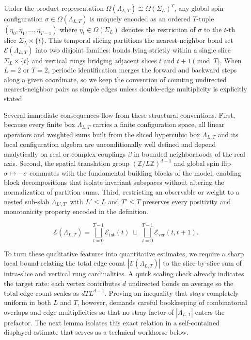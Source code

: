 \documentclass[11pt]{article}
\theoremstyle{definition}
\begin{document}
Under the product representation $\Omega(\Lambda_{L,T}) \cong \Omega(\Sigma_L)^T$,
any global spin configuration $\sigma \in \Omega(\Lambda_{L,T})$ is uniquely encoded
as an ordered $T$-tuple $(\eta_0, \eta_1, \dots, \eta_{T-1})$ where $\eta_t \in
\Omega(\Sigma_L)$ denotes the restriction of $\sigma$ to the $t$-th slice $\Sigma_L
\times \{t\}$. This temporal slicing partitions the nearest-neighbor bond set
$\mathcal{E}(\Lambda_{L,T})$ into two disjoint families: bonds lying strictly within
a single slice $\Sigma_L \times \{t\}$ and vertical rungs bridging adjacent slices
$t$ and $t + 1 \pmod{T}$. When $L = 2$ or $T = 2$, periodic identification merges
the forward and backward steps along a given coordinate, so we keep the convention
of counting undirected nearest-neighbor pairs as simple edges unless double-edge
multiplicity is explicitly stated.

Several immediate consequences flow from these structural conventions. First,
because every finite box $\Lambda_{L,T}$ carries a finite configuration space, all
linear operators and weighted sums built from the sliced hypercubic box
$\Lambda_{L,T}$ and its local configuration algebra are unconditionally well defined
and depend analytically on real or complex couplings $\beta$ in bounded
neighborhoods of the real axis. Second, the spatial translation group
$(\mathbb{Z}/L\mathbb{Z})^{d-1}$ and global spin flip $\sigma \mapsto -\sigma$
commutes with the fundamental building blocks of the model, enabling block
decompositions that isolate invariant subspaces without altering the normalization
of partition sums. Third, restricting an observable or weight to a nested sub-slab
$\Lambda_{L',T'}$ with $L' \le L$ and $T' \le T$ preserves every positivity and
monotonicity property encoded in the definition.

\[
  \mathcal{E}(\Lambda_{L,T}) = \bigsqcup_{t=0}^{T-1} \mathcal{E}_{\mathrm{int}}(t) \;\sqcup\; \bigsqcup_{t=0}^{T-1} \mathcal{E}_{\mathrm{ver}}(t, t+1).
\]

To turn these qualitative features into quantitative estimates, we require a sharp
local bound relating the total edge count $|\mathcal{E}(\Lambda_{L,T})|$ to the
slice-by-slice sum of intra-slice and vertical rung cardinalities. A quick scaling
check already indicates the target rate: each vertex contributes $d$ undirected
bonds on average so the total edge count scales as $d T L^{d-1}$. Proving an
inequality that stays completely uniform in both $L$ and $T$, however, demands
careful bookkeeping of combinatorial overlaps and edge multiplicities so that no
stray factor of $|\Lambda_{L,T}|$ enters the prefactor. The next lemma isolates this
exact relation in a self-contained displayed estimate that serves as a technical
workhorse below.
\end{document}

